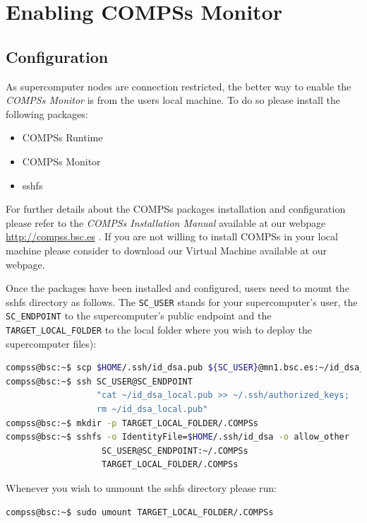 \section{Enabling COMPSs Monitor}
\label{sec:Monitor}


\subsection{Configuration}
As supercomputer nodes are connection restricted, the better way to enable the \textit{COMPSs Monitor} is from the users local machine. 
To do so please install the following packages:
\begin{itemize}
 \item COMPSs Runtime
 \item COMPSs Monitor
 \item sshfs
\end{itemize}

For further details about the COMPSs packages installation and configuration please refer to the \textit{COMPSs Installation Manual} 
available at our webpage \url{http://compss.bsc.es} . If you are not willing to install COMPSs in your local machine please consider
to download our Virtual Machine available at our webpage. 
\newline

Once the packages have been installed and configured, users need to mount the sshfs directory as follows. The \verb|SC_USER| stands for 
your supercomputer's user, the \verb|SC_ENDPOINT| to the supercomputer's public endpoint and the \verb|TARGET_LOCAL_FOLDER| to 
the local folder where you wish to deploy the supercomputer files):

\begin{lstlisting}[language=bash]
compss@bsc:~$ scp $HOME/.ssh/id_dsa.pub ${SC_USER}@mn1.bsc.es:~/id_dsa_local.pub
compss@bsc:~$ ssh SC_USER@SC_ENDPOINT 
                  "cat ~/id_dsa_local.pub >> ~/.ssh/authorized_keys; 
                  rm ~/id_dsa_local.pub"
compss@bsc:~$ mkdir -p TARGET_LOCAL_FOLDER/.COMPSs
compss@bsc:~$ sshfs -o IdentityFile=$HOME/.ssh/id_dsa -o allow_other 
                   SC_USER@SC_ENDPOINT:~/.COMPSs 
                   TARGET_LOCAL_FOLDER/.COMPSs
\end{lstlisting}

Whenever you wish to unmount the sshfs directory please run:

\begin{lstlisting}[language=bash]
compss@bsc:~$ sudo umount TARGET_LOCAL_FOLDER/.COMPSs
\end{lstlisting}


